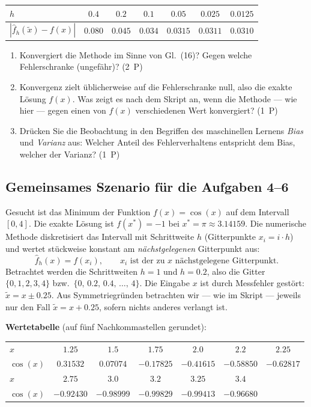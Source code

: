 \documentclass[a4paper,11pt]{scrartcl}
\begin{document}
\begin{center}
\begin{tabular}{lcccccc}
\toprule
$h$ & $0.4$ & $0.2$ & $0.1$ & $0.05$ & $0.025$ & $0.0125$ \\
\midrule
$\left|\hat{f}_h(\tilde{x}) - f(x)\right|$ & $0.080$ & $0.045$ & $0.034$ & $0.0315$ & $0.0311$ & $0.0310$ \\
\bottomrule
\end{tabular}
\end{center}

\begin{enumerate}[label=(\alph*)]
  \item Konvergiert die Methode im Sinne von Gl.~(16)? Gegen welche Fehlerschranke (ungefähr)? \hfill (2~P)
  \item Konvergenz zielt üblicherweise auf die Fehlerschranke null, also die exakte Lösung $f(x)$. Was zeigt es nach dem Skript an, wenn die Methode --- wie hier --- gegen einen von $f(x)$ verschiedenen Wert konvergiert? \hfill (1~P)
  \item Drücken Sie die Beobachtung in den Begriffen des maschinellen Lernens \emph{Bias} und \emph{Varianz} aus: Welcher Anteil des Fehlerverhaltens entspricht dem Bias, welcher der Varianz? \hfill (1~P)
\end{enumerate}

\subsection*{Gemeinsames Szenario für die Aufgaben 4--6}

Gesucht ist das Minimum der Funktion $f(x) = \cos(x)$ auf dem Intervall $[0, 4]$. Die exakte Lösung ist $f(x^*) = -1$ bei $x^* = \pi \approx 3.14159$. Die numerische Methode diskretisiert das Intervall mit Schrittweite $h$ (Gitterpunkte $x_i = i \cdot h$) und wertet stückweise konstant am \emph{nächstgelegenen} Gitterpunkt aus:
\[ \hat{f}_h(x) = f(x_i), \qquad x_i \text{ ist der zu } x \text{ nächstgelegene Gitterpunkt.} \]
Betrachtet werden die Schrittweiten $h = 1$ und $h = 0.2$, also die Gitter $\{0, 1, 2, 3, 4\}$ bzw.\ $\{0,\, 0.2,\, 0.4,\, \ldots,\, 4\}$. Die Eingabe $x$ ist durch Messfehler gestört: $\tilde{x} = x \pm 0.25$. Aus Symmetriegründen betrachten wir --- wie im Skript --- jeweils nur den Fall $\tilde{x} = x + 0.25$, sofern nichts anderes verlangt ist.

\medskip
\noindent\textbf{Wertetabelle} (auf fünf Nachkommastellen gerundet):
\begin{center}
\begin{tabular}{lcccccc}
\toprule
$x$ & $1.25$ & $1.5$ & $1.75$ & $2.0$ & $2.2$ & $2.25$ \\
$\cos(x)$ & $0.31532$ & $0.07074$ & $-0.17825$ & $-0.41615$ & $-0.58850$ & $-0.62817$ \\
\midrule
$x$ & $2.75$ & $3.0$ & $3.2$ & $3.25$ & $3.4$ & \\
$\cos(x)$ & $-0.92430$ & $-0.98999$ & $-0.99829$ & $-0.99413$ & $-0.96680$ & \\
\bottomrule
\end{tabular}
\end{center}
\end{document}
